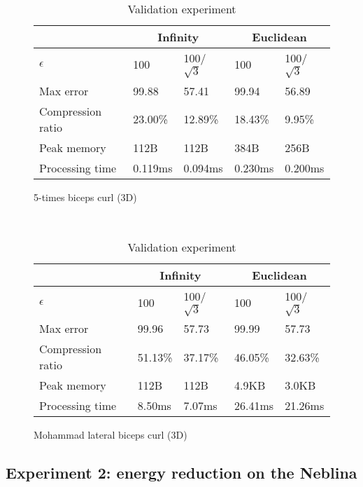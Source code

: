 \documentclass[10pt, conference, compsocconf]{IEEEtran}
\begin{document}
\begin{table}
\begin{subfigure}{\columnwidth}
    \centering
    \begin{tabular}{l|l|l|l|l}
    \hline
    \rowcolor{headcolor}
                            & \multicolumn{2}{c|}{Infinity} & \multicolumn{2}{c}{Euclidean} \\ \hline
    $\epsilon$             & 100          & 100/$\sqrt{3}$  & 100         & 100/$\sqrt{3}$   \\ 
    Max error              & 99.88       & 57.41           & 99.94       & 56.89            \\ 
    Compression ratio      & 23.00\%      & 12.89\%         & 18.43\%     & 9.95\%           \\ 
    Peak memory            & 112B         & 112B            & 384B        & 256B             \\ 
    Processing time        & 0.119ms      & 0.094ms         & 0.230ms     & 0.200ms          \\ \hline
    \end{tabular}
    \caption{5-times biceps curl (3D)}
    \end{subfigure}\\
    \begin{subfigure}{\columnwidth}
    \centering
    \begin{tabular}{l|l|l|l|l}
    \hline
    \rowcolor{headcolor}
                              & \multicolumn{2}{c|}{Infinity} & \multicolumn{2}{c}{Euclidean} \\ \hline
    $\epsilon$                & 100        & 100/$\sqrt{3}$    & 100        & 100/$\sqrt{3}$    \\
    Max error                 & 99.96     & 57.73             & 99.99      & 57.73             \\
    Compression ratio         & 51.13\%    & 37.17\%           & 46.05\%    & 32.63\%           \\
    Peak memory & 112B        & 112B              & 4.9KB      & 3.0KB             \\
    Processing time           & 8.50ms     & 7.07ms            & 26.41ms    & 21.26ms           \\ \hline
    \end{tabular}
    \caption{Mohammad lateral biceps curl (3D)}
    \end{subfigure}
    \caption{Validation experiment}
    \label{table:results-validation}
\end{table}

\subsection{Experiment 2: energy reduction on the Neblina}
\end{document}
